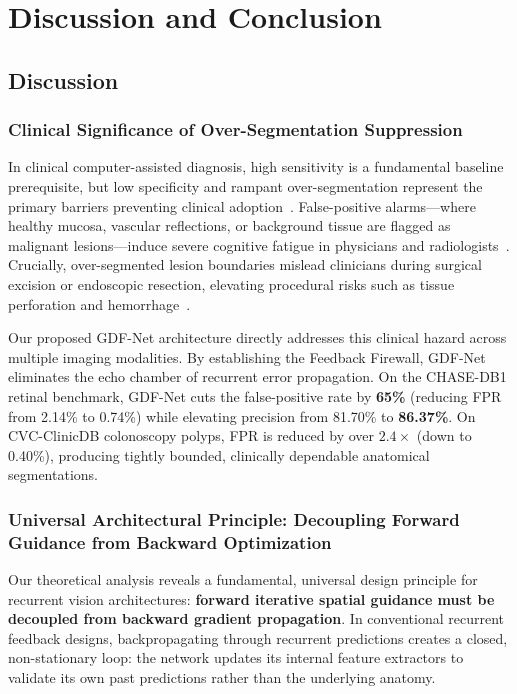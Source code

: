 \section{Discussion and Conclusion}
\label{sec:conclusion}

\subsection{Discussion}

\subsubsection{Clinical Significance of Over-Segmentation Suppression}
In clinical computer-assisted diagnosis, high sensitivity is a fundamental baseline prerequisite, but low specificity and rampant over-segmentation represent the primary barriers preventing clinical adoption~\cite{leufkens2012factors, mori2019real}. False-positive alarms---where healthy mucosa, vascular reflections, or background tissue are flagged as malignant lesions---induce severe cognitive fatigue in physicians and radiologists~\cite{mori2019real, hassan2021overcoming}. Crucially, over-segmented lesion boundaries mislead clinicians during surgical excision or endoscopic resection, elevating procedural risks such as tissue perforation and hemorrhage~\cite{rex2017colorectal}.

Our proposed GDF-Net architecture directly addresses this clinical hazard across multiple imaging modalities. By establishing the Feedback Firewall, GDF-Net eliminates the echo chamber of recurrent error propagation. On the CHASE-DB1 retinal benchmark, GDF-Net cuts the false-positive rate by \textbf{65\%} (reducing FPR from 2.14\% to 0.74\%) while elevating precision from 81.70\% to \textbf{86.37\%}. On CVC-ClinicDB colonoscopy polyps, FPR is reduced by over $2.4\times$ (down to 0.40\%), producing tightly bounded, clinically dependable anatomical segmentations.

\subsubsection{Universal Architectural Principle: Decoupling Forward Guidance from Backward Optimization}
Our theoretical analysis reveals a fundamental, universal design principle for recurrent vision architectures: \textbf{forward iterative spatial guidance must be decoupled from backward gradient propagation}. In conventional recurrent feedback designs, backpropagating through recurrent predictions creates a closed, non-stationary loop: the network updates its internal feature extractors to validate its own past predictions rather than the underlying anatomy.

